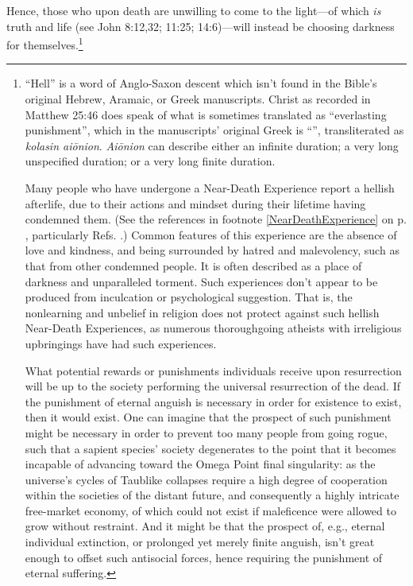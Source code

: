 \documentclass[letterpaper,12pt]{article}
\begin{document}
Hence, those who upon death are unwilling to come to the light---of which \emph{is} truth and life (see John 8:12,32; 11:25; 14:6)---will instead be choosing darkness for themselves.\footnote{\label{LogicOfPotentialPunishments}``Hell'' is a word of Anglo-Saxon descent which isn't found in the Bible's original Hebrew, Aramaic, or Greek manuscripts. Christ as recorded in Matthew 25:46 does speak of what is sometimes translated as ``everlasting punishment'', which in the manuscripts' original Greek is ``'', transliterated as \emph{kolasin ai\={o}nion}. \emph{Ai\={o}nion} can describe either an infinite duration; a very long unspecified duration; or a very long finite duration.\par
    Many people who have undergone a Near-Death Experience report a hellish afterlife, due to their actions and mindset during their lifetime having condemned them. (See the references in footnote \ref{NearDeathExperience} on p. \pageref{NearDeathExperience}, particularly Refs. .) Common features of this experience are the absence of love and kindness, and being surrounded by hatred and malevolency, such as that from other condemned people. It is often described as a place of darkness and unparalleled torment. Such experiences don't appear to be produced from inculcation or psychological suggestion. That is, the nonlearning and unbelief in religion does not protect against such hellish Near-Death Experiences, as numerous thoroughgoing atheists with irreligious upbringings have had such experiences.\par
    What potential rewards or punishments individuals receive upon resurrection will be up to the society performing the universal resurrection of the dead. If the punishment of eternal anguish is necessary in order for existence to exist, then it would exist. One can imagine that the prospect of such punishment might be necessary in order to prevent too many people from going rogue, such that a sapient species' society degenerates to the point that it becomes incapable of advancing toward the Omega Point final singularity: as the universe's cycles of Taublike collapses require a high degree of cooperation within the societies of the distant future, and consequently a highly intricate free-market economy, of which could not exist if maleficence were allowed to grow without restraint. And it might be that the prospect of, e.g., eternal individual extinction, or prolonged yet merely finite anguish, isn't great enough to offset such antisocial forces, hence requiring the punishment of eternal suffering.\par
}
\end{document}
